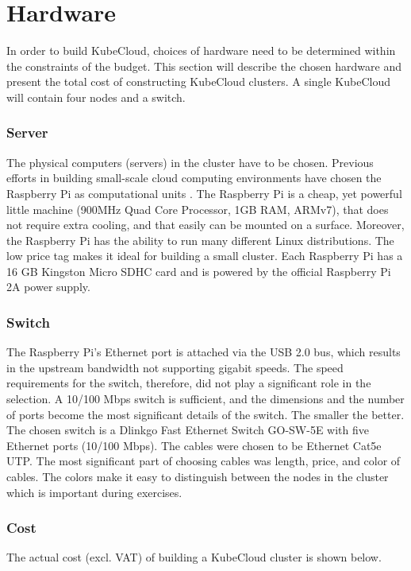 
\section{Hardware}
In order to build KubeCloud, choices of hardware need to be determined within the constraints of the budget. This section will describe the chosen hardware and present the total cost of constructing KubeCloud clusters.  A single KubeCloud will contain four nodes and a switch.

\subsubsection*{Server}

The physical computers (servers) in the cluster have to be chosen. Previous efforts in building small-scale cloud computing environments have chosen the Raspberry Pi as computational units \cite{tso2013glasgow, abrahamsson2013bolzano, cox2014iridis}. The Raspberry Pi is a cheap, yet powerful little machine (900MHz Quad Core Processor, 1GB RAM, ARMv7), that does not require extra cooling, and that easily can be mounted on a surface. Moreover, the Raspberry Pi has the ability to run many different Linux distributions. The low price tag makes it ideal for building a small cluster. Each Raspberry Pi has a 16 GB Kingston Micro SDHC card and is powered by the official Raspberry Pi 2A power supply. 


\subsubsection*{Switch}
The Raspberry Pi's Ethernet port is attached via the USB 2.0 bus, which results in the upstream bandwidth not supporting gigabit speeds. The speed requirements for the switch, therefore, did not play a significant role in the selection.  A 10/100 Mbps switch is sufficient, and the dimensions and the number of ports become the most significant details of the switch. The smaller the better. The chosen switch is a Dlinkgo Fast Ethernet Switch GO-SW-5E with five Ethernet ports (10/100 Mbps). The cables were chosen to be Ethernet Cat5e UTP. The most significant part of choosing cables was length, price, and color of cables. The colors make it easy to distinguish between the nodes in the cluster which is important during exercises.


\subsubsection*{Cost}
The actual cost (excl. VAT) of building a KubeCloud cluster is shown below.

